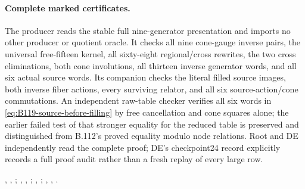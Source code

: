 \paragraph{Complete marked certificates.}
The producer reads the stable full nine-generator presentation and
imports no other producer or quotient oracle. It checks all nine
cone-gauge inverse pairs, the universal free-fifteen kernel, all
sixty-eight regional/cross rewrites, the two cross eliminations,
both cone involutions, all thirteen inverse generator words, and
all six actual source words. Its companion checks the literal filled
source images, both inverse fiber actions, every surviving relator,
and all six source-action/cone commutations. An independent raw-table
checker verifies all six words in \eqref{eq:B119-source-before-filling}
by free cancellation and cone squares alone; the earlier failed test
of that stronger equality for the reduced table is preserved and
distinguished from B.112's proved equality modulo node relations.
Root and DE independently
read the complete proof; DE's checkpoint24 record explicitly records
a full proof audit rather than a fresh replay of every large row.
\begingroup\raggedright
{},
,
;
,
,
;
,
;
,
,
.
\par\endgroup

